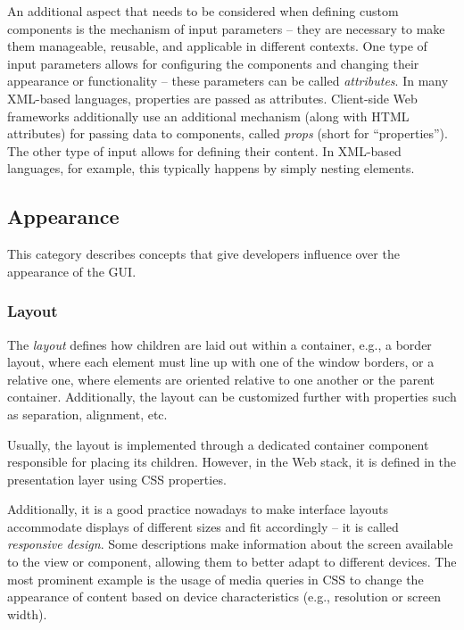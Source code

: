 An additional aspect that needs to be considered when defining custom components is the mechanism of input parameters -- they are necessary to make them manageable, reusable, and applicable in different contexts.
One type of input parameters allows for configuring the components and changing their appearance or functionality -- these parameters can be called \emph{attributes}.
In many XML-based languages, properties are passed as attributes.
Client-side Web frameworks additionally use an additional mechanism (along with HTML attributes) for passing data to components, called \emph{props} (short for \enquote{properties}).
The other type of input allows for defining their content.
In XML-based languages, for example, this typically happens by simply nesting elements.

\subsection{Appearance}\label{subsec:appearance}
This category describes concepts that give developers influence over the appearance of the GUI\@.

\subsubsection{Layout}
The \emph{layout} defines how children are laid out within a container, e.g., a border layout, where each element must line up with one of the window borders, or a relative one, where elements are oriented relative to one another or the parent container.
Additionally, the layout can be customized further with properties such as separation, alignment, etc.

Usually, the layout is implemented through a dedicated container component responsible for placing its children.
However, in the Web stack, it is defined in the presentation layer using CSS properties.

Additionally, it is a good practice nowadays to make interface layouts accommodate displays of different sizes and fit accordingly -- it is called \emph{responsive design}.
Some descriptions make information about the screen available to the view or component, allowing them to better adapt to different devices.
The most prominent example is the usage of media queries in CSS to change the appearance of content based on device characteristics (e.g., resolution or screen width).

